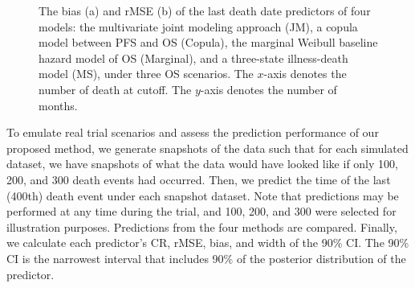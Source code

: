 \begin{figure}
\centering
{}
\caption{The bias (a) and rMSE (b) of the last death date predictors of four models: the multivariate joint modeling approach (JM), a copula model between PFS and \ac{OS} (Copula), the marginal Weibull baseline hazard model of OS (Marginal), and a three-state illness-death model (MS), under three OS scenarios. The $x$-axis denotes the number of death at cutoff. The $y$-axis denotes the number of months. \label{fig:result}}
\end{figure}



To emulate real trial scenarios and assess the prediction performance of our proposed method, we generate snapshots of the data such that for each simulated dataset, we have snapshots of what the data would have looked like if only 100, 200, and 300 death events had occurred. Then, we predict the time of the last (400th) death event under each snapshot dataset. Note that predictions may be performed at any time during the trial, and 100, 200, and 300 were selected for illustration purposes. Predictions from the four methods are compared. Finally, we calculate each predictor's \ac{CR}, \ac{rMSE}, bias, and width of the 90\% \ac{CI}. The 90\% \ac{CI} is the narrowest interval that includes 90\% of the posterior distribution of the predictor. 

